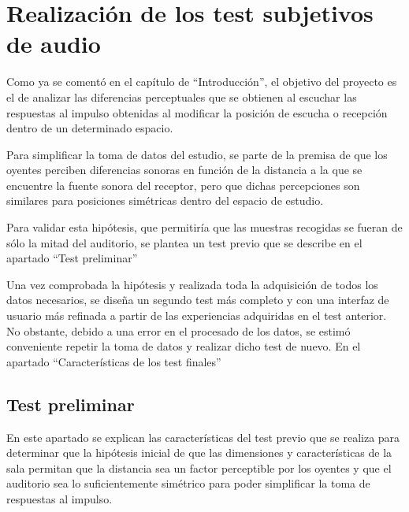 \documentclass[11pt,a4paper,twoside]{book}
\author{Víctor de Tejada Molera}
\begin{document}
    \chapter{Realización de los test subjetivos de audio}
        Como ya se comentó en el capítulo de ``Introducción'', el objetivo del proyecto es el de analizar las diferencias perceptuales que se obtienen al escuchar las respuestas al impulso obtenidas al modificar la posición de escucha o recepción dentro de un determinado espacio.
        
        Para simplificar la toma de datos del estudio, se parte de la premisa de que los oyentes perciben diferencias sonoras en función de la distancia a la que se encuentre la fuente sonora del receptor, pero que dichas percepciones son similares para posiciones simétricas dentro del espacio de estudio.
        
        Para validar esta hipótesis, que permitiría que las muestras recogidas se fueran de sólo la mitad del auditorio, se plantea un test previo que se describe en el apartado ``Test preliminar''
        
        Una vez comprobada la hipótesis y realizada toda la adquisición de todos los datos necesarios, se diseña un segundo test más completo y con una interfaz de usuario más refinada a partir de las experiencias adquiridas en el test anterior. No obstante, debido a una error en el procesado de los datos, se estimó conveniente repetir la toma de datos y realizar dicho test de nuevo. En el apartado ``Características de los test finales''
        \section{Test preliminar}
            En este apartado se explican las características del test previo que se realiza para determinar que la hipótesis inicial de que las dimensiones y características de la sala permitan que la distancia sea un factor perceptible por los oyentes y que el auditorio sea lo suficientemente simétrico para poder simplificar la toma de respuestas al impulso.
            
\end{document}
